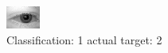 \begin{figure}[h!]
\begin{center}
\includegraphics[width=0.60\columnwidth]{figures/ID481_class_1_target_2.png}
\end{center}
\caption{ Classification: 1 actual target: 2}
\label{fig:ID481_class_1_target_2}
\end{figure}
